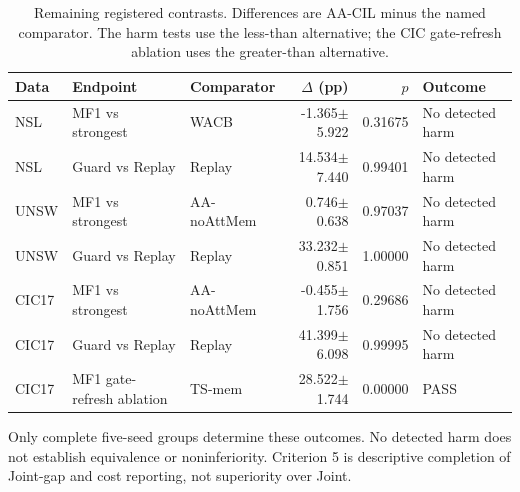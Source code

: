 \begin{table}[t]
\centering\scriptsize
\setlength{\tabcolsep}{3.8pt}
\caption{Remaining registered contrasts. Differences are AA-CIL minus the named comparator. The harm tests use the less-than alternative; the CIC gate-refresh ablation uses the greater-than alternative.}\label{tab:registered-safety}
\begin{tabular}{lllrrl}
\toprule
Data & Endpoint & Comparator & $\Delta$ (pp) & $p$ & Outcome \\
\midrule
NSL & MF1 vs strongest & WACB & -1.365$\pm$5.922 & 0.31675 & No detected harm \\
NSL & Guard vs Replay & Replay & 14.534$\pm$7.440 & 0.99401 & No detected harm \\
UNSW & MF1 vs strongest & AA-noAttMem & 0.746$\pm$0.638 & 0.97037 & No detected harm \\
UNSW & Guard vs Replay & Replay & 33.232$\pm$0.851 & 1.00000 & No detected harm \\
CIC17 & MF1 vs strongest & AA-noAttMem & -0.455$\pm$1.756 & 0.29686 & No detected harm \\
CIC17 & Guard vs Replay & Replay & 41.399$\pm$6.098 & 0.99995 & No detected harm \\
CIC17 & MF1 gate-refresh ablation & TS-mem & 28.522$\pm$1.744 & 0.00000 & PASS \\
\bottomrule
\end{tabular}
\par\vspace{2pt}\begin{minipage}{.98\linewidth}\footnotesize Only complete five-seed groups determine these outcomes. No detected harm does not establish equivalence or noninferiority. Criterion 5 is descriptive completion of Joint-gap and cost reporting, not superiority over Joint.\end{minipage}
\end{table}
